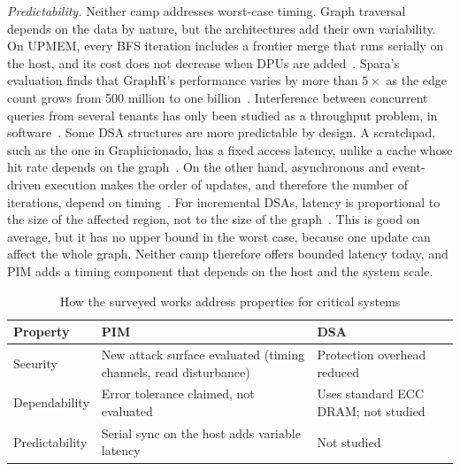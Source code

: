 \documentclass[journal,onecolumn]{IEEEtran}
\begin{document}
\emph{Predictability.} Neither camp addresses worst-case timing. Graph traversal depends on the data by nature, but the architectures add their own variability. On UPMEM, every BFS iteration includes a frontier merge that runs serially on the host, and its cost does not decrease when DPUs are added~\cite{gomezluna2022prim}. Spara's evaluation finds that GraphR's performance varies by more than $5\times$ as the edge count grows from 500 million to one billion~\cite{zheng2020spara}. Interference between concurrent queries from several tenants has only been studied as a throughput problem, in software~\cite{yin2023glign}. Some DSA structures are more predictable by design. A scratchpad, such as the one in Graphicionado, has a fixed access latency, unlike a cache whose hit rate depends on the graph~\cite{ham2016graphicionado}. On the other hand, asynchronous and event-driven execution makes the order of updates, and therefore the number of iterations, depend on timing~\cite{rahman2021jetstream,zhuo2019graphq}. For incremental DSAs, latency is proportional to the size of the affected region, not to the size of the graph~\cite{rahman2021jetstream,zhao2022tdgraph}. This is good on average, but it has no upper bound in the worst case, because one update can affect the whole graph. Neither camp therefore offers bounded latency today, and PIM adds a timing component that depends on the host and the system scale.

\begin{table}[t]
\caption{How the surveyed works address properties for critical systems}
\label{tab:critical}
\centering\footnotesize
\begin{tabularx}{\columnwidth}{@{}L{2.6cm}YY@{}}
\toprule
Property & PIM & DSA \\
\midrule
Security & New attack surface evaluated (timing channels, read disturbance)~\cite{bostanci2025impact,yuksel2026pid} & Protection overhead reduced~\cite{hua2022mgx} \\
Dependability & Error tolerance claimed, not evaluated~\cite{song2018graphr} & Uses standard ECC DRAM; not studied \\
Predictability & Serial sync on the host adds variable latency~\cite{gomezluna2022prim} & Not studied \\
\bottomrule
\end{tabularx}
\end{table}

\end{document}
